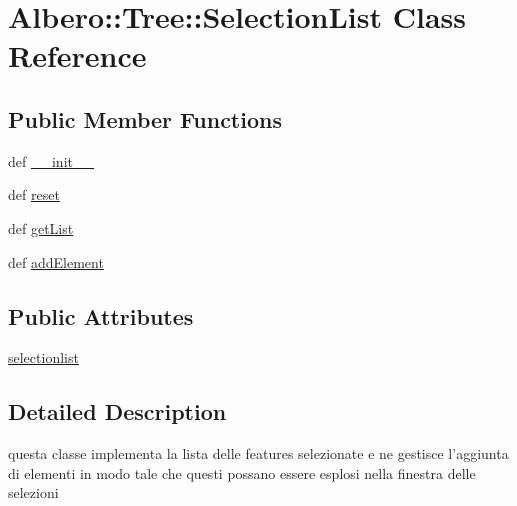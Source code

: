 \hypertarget{classAlbero_1_1Tree_1_1SelectionList}{
\section{Albero::Tree::SelectionList Class Reference}
\label{classAlbero_1_1Tree_1_1SelectionList}
}
\subsection*{Public Member Functions}
\begin{DoxyCompactItemize}
\item 
def \hyperlink{classAlbero_1_1Tree_1_1SelectionList_ac3e541bc70fa9d4eb810e80af07d677c}{\_\-\_\-init\_\-\_\-}
\item 
def \hyperlink{classAlbero_1_1Tree_1_1SelectionList_a077b1daf751a139792915708f438e975}{reset}
\item 
def \hyperlink{classAlbero_1_1Tree_1_1SelectionList_af1cc1853b821b7cc7600427fae15880e}{getList}
\item 
def \hyperlink{classAlbero_1_1Tree_1_1SelectionList_a4c8a1a35a7f9daa2154b31776d1eb754}{addElement}
\end{DoxyCompactItemize}
\subsection*{Public Attributes}
\begin{DoxyCompactItemize}
\item 
\hyperlink{classAlbero_1_1Tree_1_1SelectionList_a8bf32cbea89df3577a9ae859b7e4042a}{selectionlist}
\end{DoxyCompactItemize}


\subsection{Detailed Description}
\begin{DoxyVerb}
questa classe implementa la lista delle features
selezionate e ne gestisce l'aggiunta di elementi
in modo tale che questi possano essere esplosi nella
finestra delle selezioni
\end{DoxyVerb}
 

